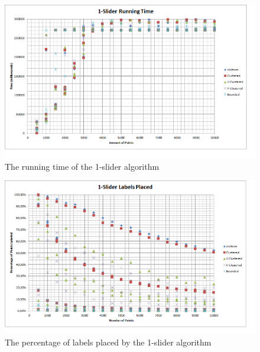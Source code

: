 \documentclass[crop=false,a4paper,oneside,11pt]{standalone}
\begin{document}
 \begin{figure}[H]
 \centering
 \centerline{\includegraphics[scale = 0.65]{1slider.png}}
 \caption{The running time of the 1-slider algorithm}
 \end{figure}

 \begin{figure}[H]
 \centering
  \centerline{\includegraphics[scale = 0.65]{1sliderplaced.png}}
  \caption{The percentage of labels placed by the 1-slider algorithm}
 \end{figure}
\end{document}
